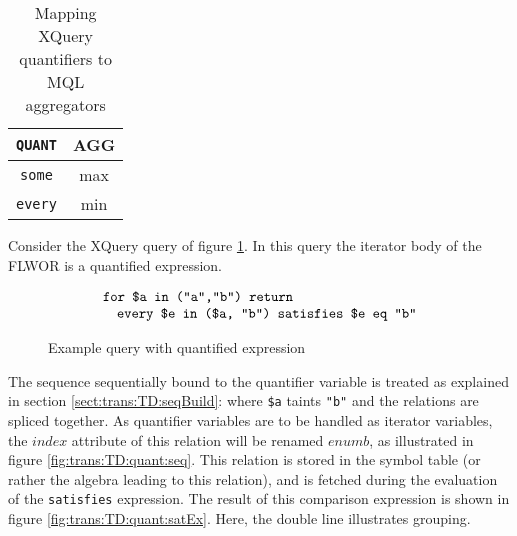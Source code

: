 \begin{table}[h]
\centering
\begin{tabular}{c|c} 
\texttt{QUANT} & \textsf{AGG} \\ \hline
\texttt{some} & \textsf{max} \\
\texttt{every} & \textsf{min}
\end{tabular}
\caption{Mapping XQuery quantifiers to MQL aggregators \label{tab:disc:quant}}
\end{table}

\begin{myExample}
Consider the XQuery query of figure \ref{fig:trans:TD:quantQu}. In this query the iterator body of the FLWOR is a
quantified expression.
\begin{figure}[h]
\begin{equation*}
\begin{array}{l}
\mbox{\texttt{for \$a in ("a","b") return}} \\ \quad
\mbox{\texttt{every \$e in (\$a, "b") satisfies \$e eq "b"}}
\end{array}
\end{equation*}
\caption{Example query with quantified expression \label{fig:trans:TD:quantQu}}
\end{figure}

The sequence sequentially bound to the quantifier variable is treated as explained in section
\ref{sect:trans:TD:seqBuild}: where \texttt{\$a} taints \texttt{"b"} and the relations are spliced together. As
quantifier variables are to be handled as iterator variables, the $index$ attribute of this relation will be
renamed $enumb$, as illustrated in figure \ref{fig:trans:TD:quant:seq}. This relation is stored in the symbol table
(or rather the algebra leading to this relation), and is fetched during the evaluation of the \texttt{satisfies}
expression. The result of this comparison expression is shown in figure \ref{fig:trans:TD:quant:satEx}. Here, the
double line illustrates grouping. 


\end{myExample}
